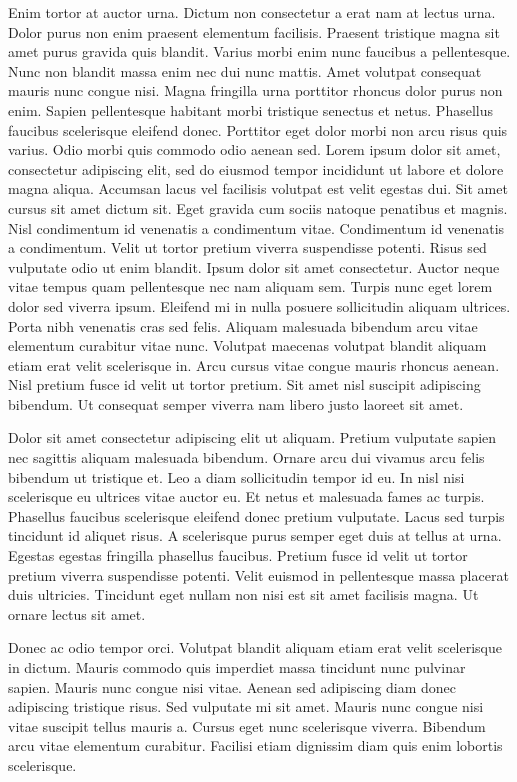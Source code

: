 \documentclass[a4]{report}
\begin{document}
Enim tortor at auctor urna. Dictum non consectetur a erat nam at lectus urna. Dolor purus non enim praesent elementum facilisis. Praesent tristique magna sit amet purus gravida quis blandit. Varius morbi enim nunc faucibus a pellentesque. Nunc non blandit massa enim nec dui nunc mattis. Amet volutpat consequat mauris nunc congue nisi. Magna fringilla urna porttitor rhoncus dolor purus non enim. Sapien pellentesque habitant morbi tristique senectus et netus. Phasellus faucibus scelerisque eleifend donec. Porttitor eget dolor morbi non arcu risus quis varius. Odio morbi quis commodo odio aenean sed.
Lorem ipsum dolor sit amet, consectetur adipiscing elit, sed do eiusmod tempor incididunt ut labore et dolore magna aliqua. Accumsan lacus vel facilisis volutpat est velit egestas dui. Sit amet cursus sit amet dictum sit. Eget gravida cum sociis natoque penatibus et magnis. Nisl condimentum id venenatis a condimentum vitae. Condimentum id venenatis a condimentum. Velit ut tortor pretium viverra suspendisse potenti. Risus sed vulputate odio ut enim blandit. Ipsum dolor sit amet consectetur. Auctor neque vitae tempus quam pellentesque nec nam aliquam sem. Turpis nunc eget lorem dolor sed viverra ipsum. Eleifend mi in nulla posuere sollicitudin aliquam ultrices. Porta nibh venenatis cras sed felis. Aliquam malesuada bibendum arcu vitae elementum curabitur vitae nunc. Volutpat maecenas volutpat blandit aliquam etiam erat velit scelerisque in. Arcu cursus vitae congue mauris rhoncus aenean. Nisl pretium fusce id velit ut tortor pretium. Sit amet nisl suscipit adipiscing bibendum. Ut consequat semper viverra nam libero justo laoreet sit amet.

Dolor sit amet consectetur adipiscing elit ut aliquam. Pretium vulputate sapien nec sagittis aliquam malesuada bibendum. Ornare arcu dui vivamus arcu felis bibendum ut tristique et. Leo a diam sollicitudin tempor id eu. In nisl nisi scelerisque eu ultrices vitae auctor eu. Et netus et malesuada fames ac turpis. Phasellus faucibus scelerisque eleifend donec pretium vulputate. Lacus sed turpis tincidunt id aliquet risus. A scelerisque purus semper eget duis at tellus at urna. Egestas egestas fringilla phasellus faucibus. Pretium fusce id velit ut tortor pretium viverra suspendisse potenti. Velit euismod in pellentesque massa placerat duis ultricies. Tincidunt eget nullam non nisi est sit amet facilisis magna. Ut ornare lectus sit amet.

Donec ac odio tempor orci. Volutpat blandit aliquam etiam erat velit scelerisque in dictum. Mauris commodo quis imperdiet massa tincidunt nunc pulvinar sapien. Mauris nunc congue nisi vitae. Aenean sed adipiscing diam donec adipiscing tristique risus. Sed vulputate mi sit amet. Mauris nunc congue nisi vitae suscipit tellus mauris a. Cursus eget nunc scelerisque viverra. Bibendum arcu vitae elementum curabitur. Facilisi etiam dignissim diam quis enim lobortis scelerisque.
\end{document}
